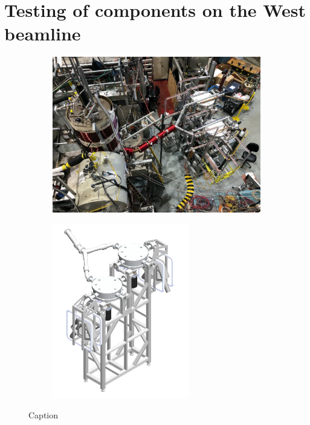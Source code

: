 
\chapter{Testing of components on the West beamline}\label{chap:fall2021}


\begin{figure}
\centering
\begin{subfigure}{.5\textwidth} 
  \centering
  \includegraphics[width=\textwidth]{figures/west_beamline_switcher_tests.png}
  \caption{}\label{subfig:west_beamline_switchers}
\end{subfigure}%
\begin{subfigure}{.5\textwidth}
  \centering
  \includegraphics[height=3in]{figures/switcher_mockup.png}
  \caption{}\label{subfig:switcher_mockup}
\end{subfigure}
\caption
{Caption}
\label{fig:west_beamline_switchers}
\end{figure}

